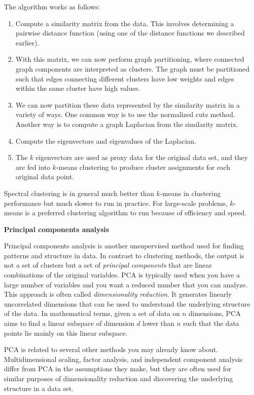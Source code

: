 \documentclass[]{krantz}
\begin{document}
The algorithm works as follows:

\begin{enumerate}
\def\labelenumi{\arabic{enumi}.}
\item
  Compute a similarity matrix from the data. This involves determining a
  pairwise distance function (using one of the distance functions we
  described earlier).
\item
  With this matrix, we can now perform graph partitioning, where
  connected graph components are interpreted as clusters. The graph must
  be partitioned such that edges connecting different clusters have low
  weights and edges within the same cluster have high values.
\item
  We can now partition these data represented by the similarity matrix
  in a variety of ways. One common way is to use the normalized cuts
  method. Another way is to compute a graph Laplacian from the
  similarity matrix.
\item
  Compute the eigenvectors and eigenvalues of the Laplacian.
\item
  The \(k\) eigenvectors are used as proxy data for the original data
  set, and they are fed into \(k\)-means clustering to produce cluster
  assignments for each original data point.
\end{enumerate}

Spectral clustering is in general much better than \(k\)-means in
clustering performance but much slower to run in practice. For
large-scale problems, \(k\)-means is a preferred clustering algorithm to
run because of efficiency and speed.

\textbf{Principal components analysis}

Principal components analysis is another unsupervised method used for
finding patterns and structure in data. In contrast to clustering
methods, the output is not a set of clusters but a set of
\emph{principal components} that are linear combinations of the original
variables. PCA is typically used when you have a large number of
variables and you want a reduced number that you can analyze. This
approach is often called \emph{dimensionality reduction}. It generates
linearly uncorrelated dimensions that can be used to understand the
underlying structure of the data. In mathematical terms, given a set of
data on \(n\) dimensions, PCA aims to find a linear subspace of
dimension \(d\) lower than \(n\) such that the data points lie mainly on
this linear subspace.

PCA is related to several other methods you may already know about.
Multidimensional scaling, factor analysis, and independent component
analysis differ from PCA in the assumptions they make, but they are
often used for similar purposes of dimensionality reduction and
discovering the underlying structure in a data set.
\end{document}
